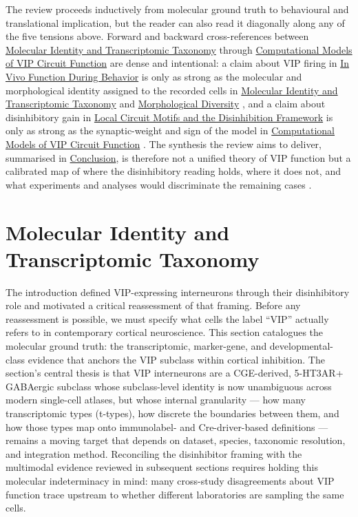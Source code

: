 \documentclass[11pt]{article}
\begin{document}
The review proceeds inductively from molecular ground truth to behavioural and translational implication, but the reader can also read it diagonally along any of the five tensions above. Forward and backward cross-references between \href{/classification}{Molecular Identity and Transcriptomic Taxonomy} through \href{/computational-models}{Computational Models of VIP Circuit Function} are dense and intentional: a claim about VIP firing in \href{/in-vivo-behavior}{In Vivo Function During Behavior} is only as strong as the molecular and morphological identity assigned to the recorded cells in \href{/classification}{Molecular Identity and Transcriptomic Taxonomy} and \href{/morphology}{Morphological Diversity} \citep{Tasic2018, Gouwens2020a, Pronneke2015, Schneidermizell2025}, and a claim about disinhibitory gain in \href{/disinhibition-framework}{Local Circuit Motifs and the Disinhibition Framework} is only as strong as the synaptic-weight and sign of the model in \href{/computational-models}{Computational Models of VIP Circuit Function} \citep{Hertag2019, Garciadelmolino2017, Veit2023, Reimann2026}. The synthesis the review aims to deliver, summarised in \href{/conclusion}{Conclusion}, is therefore not a unified theory of VIP function but a calibrated map of where the disinhibitory reading holds, where it does not, and what experiments and analyses would discriminate the remaining cases \citep{Pi2013, Pakan2016, Dipoppa2018, Garciadelmolino2017, Reimann2026}.


\section{Molecular Identity and Transcriptomic Taxonomy}
\label{sec:02_classification}

The introduction defined VIP-expressing interneurons through their disinhibitory role and motivated a critical reassessment of that framing. Before any reassessment is possible, we must specify what cells the label ``VIP'' actually refers to in contemporary cortical neuroscience. This section catalogues the molecular ground truth: the transcriptomic, marker-gene, and developmental-class evidence that anchors the VIP subclass within cortical inhibition. The section's central thesis is that VIP interneurons are a CGE-derived, 5-HT3AR+ GABAergic subclass whose subclass-level identity is now unambiguous across modern single-cell atlases, but whose internal granularity --- how many transcriptomic types (t-types), how discrete the boundaries between them, and how those types map onto immunolabel- and Cre-driver-based definitions --- remains a moving target that depends on dataset, species, taxonomic resolution, and integration method. Reconciling the disinhibitor framing with the multimodal evidence reviewed in subsequent sections requires holding this molecular indeterminacy in mind: many cross-study disagreements about VIP function trace upstream to whether different laboratories are sampling the same cells.
\end{document}
